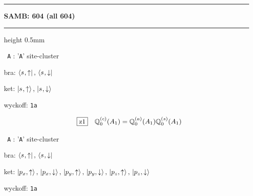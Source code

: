 \documentclass[fleqn,10pt,landscape]{jsarticle}
\begin{document}
\vspace{5mm}
\noindent \rule[0.5mm]{5mm}{0.5mm}\hspace{3mm}\textbf{SAMB: 604 (all 604)}\hspace{3mm}\leaders\hrule height 0.5mm\hfill\kern0pt
\vspace{3mm}

\vspace{5mm}

\noindent\textbullet\, \texttt{A} : '\texttt{A}' site-cluster

\noindent\quad * bra: $\bra{s_{},\uparrow},\, \bra{s_{},\downarrow}$

\noindent\quad * ket: $\ket{s_{},\uparrow},\, \ket{s_{},\downarrow}$

\noindent\quad * wyckoff: \texttt{1a}

\begin{dmath*}
\hspace*{3mm}\fbox{z1}\quad \mathbb{Q}_{0}^{(c)}(A_{1})=\mathbb{Q}_{0}^{(a)}(A_{1}) \mathbb{Q}_{0}^{(s)}(A_{1})
\end{dmath*}
\vspace{5mm}

\noindent\textbullet\, \texttt{A} : '\texttt{A}' site-cluster

\noindent\quad * bra: $\bra{s_{},\uparrow},\, \bra{s_{},\downarrow}$

\noindent\quad * ket: $\ket{p_{x},\uparrow},\, \ket{p_{x},\downarrow},\, \ket{p_{y},\uparrow},\, \ket{p_{y},\downarrow},\, \ket{p_{z},\uparrow},\, \ket{p_{z},\downarrow}$

\noindent\quad * wyckoff: \texttt{1a}
\end{document}
